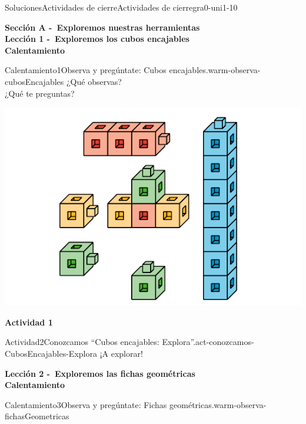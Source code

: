\documentclass[twoside,10pt,]{article}
\begin{document}
\begin{solutions-section}{Soluciones}{Actividades de cierre}{}{Actividades de cierre}{}{}{gra0-uni1-10}
\par\medskip
\noindent\textbf{\large{}\space\textperiodcentered\space{}Sección A -~Exploremos nuestras herramientas\\
\space\textperiodcentered\space{}Lección 1 -~Exploremos los cubos encajables\\
\space\textperiodcentered\space{}Calentamiento}
\begin{explorationsolution}{Calentamiento}{1}{Observa y pregúntate: Cubos encajables.}{warm-observa-cubosEncajables}%
¿Qué observas?\\
¿Qué te preguntas?\begin{image}{0}{1}{0}{}%
\includegraphics[width=\linewidth]{external/svg-source/tikz-file-147993.pdf}
\end{image}%
\end{explorationsolution}%
\par\medskip
\noindent\textbf{\large{}\space\textperiodcentered\space{}Actividad 1}
\begin{activitysolution}{Actividad}{2}{Conozcamos “Cubos encajables: Explora”.}{act-conozcamos-CubosEncajables-Explora}%
¡A explorar!%
\end{activitysolution}%
\par\medskip
\noindent\textbf{\large{}\space\textperiodcentered\space{}Lección 2 -~Exploremos las fichas geométricas\\
\space\textperiodcentered\space{}Calentamiento}
\begin{explorationsolution}{Calentamiento}{3}{Observa y pregúntate: Fichas geométricas.}{warm-observa-fichasGeometricas}%

\end{explorationsolution}
\end{solutions-section}
\end{document}

